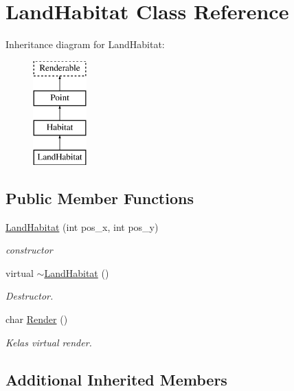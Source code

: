 \hypertarget{class_land_habitat}{}\section{Land\+Habitat Class Reference}
\label{class_land_habitat}
Inheritance diagram for Land\+Habitat\+:\begin{figure}[H]
\begin{center}
\leavevmode
\includegraphics[height=4.000000cm]{class_land_habitat}
\end{center}
\end{figure}
\subsection*{Public Member Functions}
\begin{DoxyCompactItemize}
\item 
\hyperlink{class_land_habitat_ac269030ac7c2c4e874558d212c07fe33}{Land\+Habitat} (int pos\+\_\+x, int pos\+\_\+y)
\begin{DoxyCompactList}\small\item\em constructor \end{DoxyCompactList}\item 
virtual \hyperlink{class_land_habitat_a0c1aebc080f875b9053f3a776aea627a}{$\sim$\+Land\+Habitat} ()\hypertarget{class_land_habitat_a0c1aebc080f875b9053f3a776aea627a}{}\label{class_land_habitat_a0c1aebc080f875b9053f3a776aea627a}

\begin{DoxyCompactList}\small\item\em Destructor. \end{DoxyCompactList}\item 
char \hyperlink{class_land_habitat_ad2147498f493b01429ae315f0145d3a9}{Render} ()
\begin{DoxyCompactList}\small\item\em Kelas virtual render. \end{DoxyCompactList}\end{DoxyCompactItemize}
\subsection*{Additional Inherited Members}


